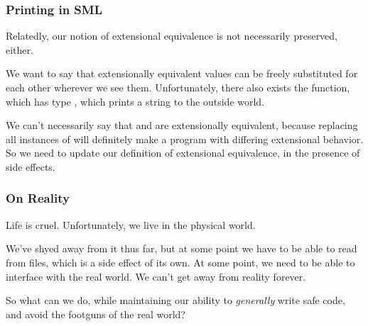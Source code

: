 \documentclass[aspectratio=169]{beamer}
\begin{document}
\begin{frame}[fragile]
  \frametitle{Printing in SML}

  Relatedly, our notion of extensional equivalence is not necessarily preserved,
  either.

  \pause
  \vspace{\fill}

  We want to say that extensionally equivalent values can be freely substituted
  for each other wherever we see them. Unfortunately, there also exists
  the  function, which has type , which
  prints a string to the outside world.

  \pause
  \vspace{\fill}

  We can't necessarily say that  and \code{()} are extensionally
  equivalent, because replacing all instances of \code{()} will definitely make
  a program with differing extensional behavior. So we need to update our
  definition of extensional equivalence, in the presence of side effects.
\end{frame}


\begin{frame}[fragile]
  \frametitle{On Reality}

  Life is cruel. Unfortunately, we live in the physical world.

  \pause
  \vspace{\fill}

  We've shyed away from it thus far, but at some point we have to be able to read
  from files, which is a side effect of its own. At some point, we need to be able
  to interface with the real world. We can't get away from reality forever.

  \pause
  \vspace{\fill}

  So what can we do, while maintaining our ability to \textit{generally} write
  safe code, and avoid the footguns of the real world?
\end{frame}
\end{document}
